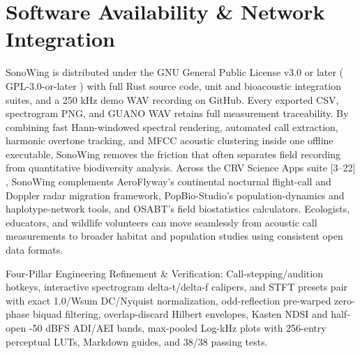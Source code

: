 \documentclass[10pt,letterpaper]{article}
\begin{document}
\section{Software Availability \& Network Integration}
SonoWing is distributed under the GNU General Public License v3.0 or later ( GPL-3.0-or-later ) with full Rust source code, unit and bioacoustic integration suites, and a 250 kHz demo WAV recording on GitHub. Every exported CSV, spectrogram PNG, and GUANO WAV retains full measurement traceability. By combining fast Hann-windowed spectral rendering, automated call extraction, harmonic overtone tracking, and MFCC acoustic clustering inside one offline executable, SonoWing removes the friction that often separates field recording from quantitative biodiversity analysis. Across the CRV Science Apps suite [3--22] , SonoWing complements AeroFlyway's continental nocturnal flight-call and Doppler radar migration framework, PopBio-Studio's population-dynamics and haplotype-network tools, and OSABT's field biostatistics calculators. Ecologists, educators, and wildlife volunteers can move seamlessly from acoustic call measurements to broader habitat and population studies using consistent open data formats.

Four-Pillar Engineering Refinement \& Verification: Call-stepping/audition hotkeys, interactive spectrogram delta-t/delta-f calipers, and STFT presets pair with exact 1.0/Wsum DC/Nyquist normalization, odd-reflection pre-warped zero-phase biquad filtering, overlap-discard Hilbert envelopes, Kasten NDSI and half-open -50 dBFS ADI/AEI bands, max-pooled Log-kHz plots with 256-entry perceptual LUTs, Markdown guides, and 38/38 passing tests.
\end{document}
